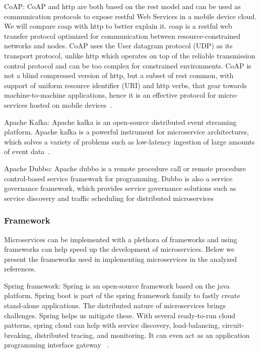 \par CoAP: CoAP and http are both based on the rest model and can be used as communication protocols to expose restful Web Services in a mobile device cloud. We will compare coap with http to better explain it. coap is a restful web transfer protocol optimized for communication between resource-constrained networks and nodes. CoAP uses the User datagram protocol (UDP) as its transport protocol, unlike http which operates on top of the reliable transmission control protocol and can be too complex for constrained environments. CoAP is not a blind compressed version of http, but a subset of rest common, with support of uniform resource identifier (URI) and http verbs, that gear towards machine-to-machine applications, hence it is an effective protocol for micro-services hosted on mobile devices~\cite{liu2018, khan2017}.

\par Apache Kafka: Apache kafka is an open-source distributed event streaming platform. Apache kafka is a powerful instrument for microservice architectures, which solves a variety of problems such as low-latency ingestion of large amounts of event data~\cite{wang2020, ebay}.

\par Apache Dubbo: Apache dubbo is a remote procedure call or remote procedure control-based service framework for programming. Dubbo is also a service governance framework, which provides service governance solutions such as service discovery and traffic scheduling for distributed microservices~\cite{Zhang2019}


\subsubsection{Framework}

Microservices can be implemented with a plethora of frameworks and using frameworks can help speed up the development of microservices. Below we present the frameworks used in implementing microservices in the analyzed references.

\par Spring framework: Spring is an open-source framework based on the java platform. Spring boot is part of the spring framework family to fastly create stand-alone applications. The distributed nature of microservices brings challenges. Spring helps us mitigate these. With several ready-to-run cloud patterns, spring cloud can help with service discovery, load-balancing, circuit-breaking, distributed tracing, and monitoring. It can even act as an application programming interface gateway ~\cite{KalskeM2017, selmadji2020, Santos2020}.

